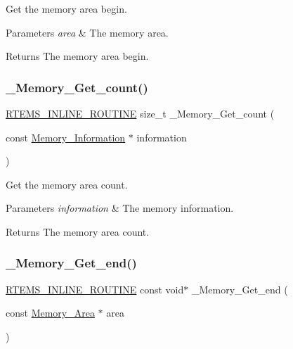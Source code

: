Get the memory area begin. 


\begin{DoxyParams}{Parameters}
{\em area} & The memory area.\\
\hline
\end{DoxyParams}
\begin{DoxyReturn}{Returns}
The memory area begin. 
\end{DoxyReturn}
\mbox{\label{group__RTEMSScoreMemory_ga23cf58983e4010f47140bc68d9ff9e93}} 
\subsubsection{\texorpdfstring{\_Memory\_Get\_count()}{\_Memory\_Get\_count()}}
{\footnotesize\ttfamily \mbox{\hyperlink{group__RTEMSScoreBaseDefs_gac216239df231d5dbd15e3520b0b9313f}{R\+T\+E\+M\+S\+\_\+\+I\+N\+L\+I\+N\+E\+\_\+\+R\+O\+U\+T\+I\+NE}} size\+\_\+t \+\_\+\+Memory\+\_\+\+Get\+\_\+count (\begin{DoxyParamCaption}\item[{const \mbox{\hyperlink{structMemory__Information}{Memory\+\_\+\+Information}} $\ast$}]{information }\end{DoxyParamCaption})}



Get the memory area count. 


\begin{DoxyParams}{Parameters}
{\em information} & The memory information.\\
\hline
\end{DoxyParams}
\begin{DoxyReturn}{Returns}
The memory area count. 
\end{DoxyReturn}
\mbox{\label{group__RTEMSScoreMemory_ga7901f87a55e1d2031465b9b6b535a78b}} 
\subsubsection{\texorpdfstring{\_Memory\_Get\_end()}{\_Memory\_Get\_end()}}
{\footnotesize\ttfamily \mbox{\hyperlink{group__RTEMSScoreBaseDefs_gac216239df231d5dbd15e3520b0b9313f}{R\+T\+E\+M\+S\+\_\+\+I\+N\+L\+I\+N\+E\+\_\+\+R\+O\+U\+T\+I\+NE}} const void$\ast$ \+\_\+\+Memory\+\_\+\+Get\+\_\+end (\begin{DoxyParamCaption}\item[{const \mbox{\hyperlink{structMemory__Area}{Memory\+\_\+\+Area}} $\ast$}]{area }\end{DoxyParamCaption})}



